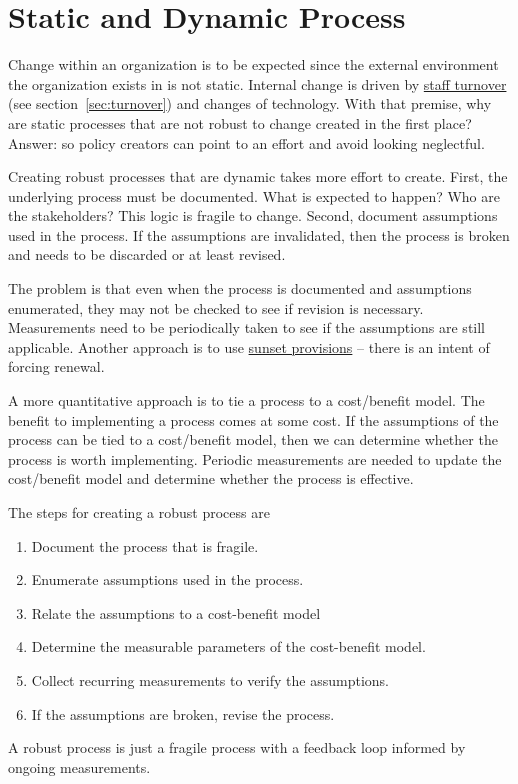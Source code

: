 \section{Static and Dynamic Process\label{sec:static-dynamic_processes}}


Change within an organization is to be expected since the external environment the organization exists in is not static. Internal change is driven by \hyperref[sec:turnover]{staff turnover} 
\ifsectionref
(see section~\ref{sec:turnover}) 
\fi
and changes of technology. With that premise, why are static processes that are not robust to change created in the first place? Answer: so policy creators can point to an effort and avoid looking neglectful.

Creating robust processes that are dynamic takes more effort to create. First, the underlying process must be documented. What is expected to happen? Who are the stakeholders? This logic is fragile to change. Second, document assumptions used in the process. If the assumptions are invalidated, then the process is broken and needs to be discarded or at least revised. 

The problem is that even when the process is documented and assumptions enumerated, they may not be checked to see if revision is necessary. Measurements need to be periodically taken to see if the assumptions are still applicable. Another approach is to use \href{https://en.wikipedia.org/wiki/Sunset_provision}{sunset provisions} -- there is an intent of forcing renewal. 

A more quantitative approach is to tie a process to a cost/benefit model. The benefit to implementing a process comes at some cost. If the assumptions of the process can be tied to a cost/benefit model, then we can determine whether the process is worth implementing. Periodic measurements are needed to update the cost/benefit model and determine whether the process is effective.

The steps for creating a robust process are
\begin{enumerate}
    \item Document the process that is fragile.
    \item Enumerate assumptions used in the process. 
    \item Relate the assumptions to a cost-benefit model
    \item Determine the measurable parameters of the cost-benefit model. 
    \item Collect recurring measurements to verify the assumptions. 
    \item If the assumptions are broken, revise the process. 
\end{enumerate}
A robust process is just a fragile process with a feedback loop informed by ongoing measurements. 